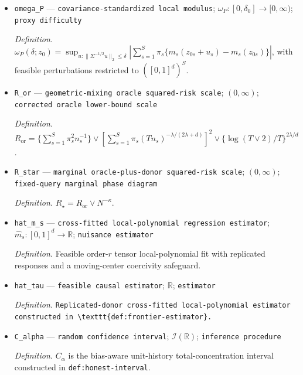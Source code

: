 \documentclass{article}
\begin{document}
\begin{itemize}
  \par\smallskip\noindent\emph{Definition.} \(\tau(z_0)=\sum_{s=1}^{S}\pi_s\{\mu_{1s}(z_0)-m_s(z_{0s})\}\).
  \item \texttt{omega\_\allowbreak{}P} --- \texttt{covariance-\allowbreak{}standardized local modulus}; \(\omega_P:[0,\delta_0]\to[0,\infty)\); \texttt{proxy difficulty}
  \par\smallskip\noindent\emph{Definition.} \(\omega_P(\delta;z_0)=\sup_{u:\|\Sigma^{-1/2}u\|_2\le\delta}|\sum_{s=1}^{S}\pi_s\{m_s(z_{0s}+u_s)-m_s(z_{0s})\}|\), with feasible perturbations restricted to \(([0,1]^d)^S\).
  \item \texttt{R\_\allowbreak{}or} --- \texttt{geometric-\allowbreak{}mixing oracle squared-\allowbreak{}risk scale}; \((0,\infty)\); \texttt{corrected oracle lower-\allowbreak{}bound scale}
  \par\smallskip\noindent\emph{Definition.} \(R_{\mathrm{or}}=\{\sum_{s=1}^{S}\pi_s^2n_s^{-1}\}\vee[\sum_{s=1}^{S}\pi_s(Tn_s)^{-\lambda/(2\lambda+d)}]^2\vee\{\log(T\vee2)/T\}^{2\lambda/d}\).
  \item \texttt{R\_\allowbreak{}star} --- \texttt{marginal oracle-\allowbreak{}plus-\allowbreak{}donor squared-\allowbreak{}risk scale}; \((0,\infty)\); \texttt{fixed-\allowbreak{}query marginal phase diagram}
  \par\smallskip\noindent\emph{Definition.} \(R_{\star}=R_{\mathrm{or}}\vee N^{-\kappa}\).
  \item \texttt{hat\_\allowbreak{}m\_\allowbreak{}s} --- \texttt{cross-\allowbreak{}fitted local-\allowbreak{}polynomial regression estimator}; \(\widehat m_s:[0,1]^d\to\mathbb R\); \texttt{nuisance estimator}
  \par\smallskip\noindent\emph{Definition.} Feasible order-\(r\) tensor local-polynomial fit with replicated responses and a moving-center coercivity safeguard.
  \item \texttt{hat\_\allowbreak{}tau} --- \texttt{feasible causal estimator}; \(\mathbb R\); \texttt{estimator}
  \par\smallskip\noindent\emph{Definition.} \texttt{Replicated-\allowbreak{}donor cross-\allowbreak{}fitted local-\allowbreak{}polynomial estimator constructed in \textbackslash{}\allowbreak{}texttt\{def:\allowbreak{}frontier-\allowbreak{}estimator\}\allowbreak{}.}
  \item \texttt{C\_\allowbreak{}alpha} --- \texttt{random confidence interval}; \(\mathcal I(\mathbb R)\); \texttt{inference procedure}
  \par\smallskip\noindent\emph{Definition.} \(C_\alpha\) is the bias-aware unit-history total-concentration interval constructed in \texttt{def:honest-interval}.

\end{itemize}
\end{document}
